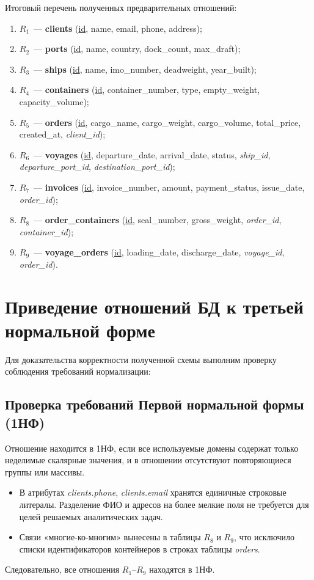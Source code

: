 \documentclass[a4paper,14pt]{article}
\begin{document}
Итоговый перечень полученных предварительных отношений:
\begin{enumerate}
    \item $R_1$~--- \textbf{clients} (\underline{id}, name, email, phone, address);
    \item $R_2$~--- \textbf{ports} (\underline{id}, name, country, dock\_count, max\_draft);
    \item $R_3$~--- \textbf{ships} (\underline{id}, name, imo\_number, deadweight, year\_built);
    \item $R_4$~--- \textbf{containers} (\underline{id}, container\_number, type, empty\_weight, capacity\_volume);
    \item $R_5$~--- \textbf{orders} (\underline{id}, cargo\_name, cargo\_weight, cargo\_volume, total\_price, created\_at, \textit{client\_id});
    \item $R_6$~--- \textbf{voyages} (\underline{id}, departure\_date, arrival\_date, status, \textit{ship\_id}, \textit{departure\_port\_id}, \textit{destination\_port\_id});
    \item $R_7$~--- \textbf{invoices} (\underline{id}, invoice\_number, amount, payment\_status, issue\_date, \textit{order\_id});
    \item $R_8$~--- \textbf{order\_containers} (\underline{id}, seal\_number, gross\_weight, \textit{order\_id}, \textit{container\_id});
    \item $R_9$~--- \textbf{voyage\_orders} (\underline{id}, loading\_date, discharge\_date, \textit{voyage\_id}, \textit{order\_id}).
\end{enumerate}

\newpage
\section{Приведение отношений БД к третьей нормальной форме}

Для доказательства корректности полученной схемы выполним проверку соблюдения требований нормализации:

\subsection{Проверка требований Первой нормальной формы (1НФ)}
Отношение находится в 1НФ, если все используемые домены содержат только неделимые скалярные значения, и в отношении отсутствуют повторяющиеся группы или массивы.
\begin{itemize}
    \item В атрибутах \textit{clients.phone}, \textit{clients.email} хранятся единичные строковые литералы. Разделение ФИО и адресов на более мелкие поля не требуется для целей решаемых аналитических задач.
    \item Связи «многие-ко-многим» вынесены в таблицы $R_8$ и $R_9$, что исключило списки идентификаторов контейнеров в строках таблицы \textit{orders}.
\end{itemize}
Следовательно, все отношения $R_1$--$R_9$ находятся в 1НФ.
\end{document}
